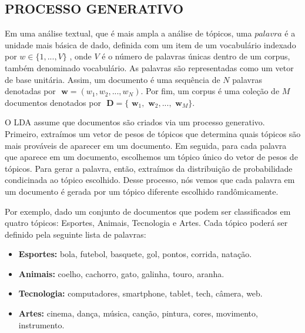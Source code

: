 \documentclass[12pt,a4paper]{article}
\begin{document}
  
  
  
  \subsection{PROCESSO GENERATIVO}
  
  Em uma análise textual, que é mais ampla a análise de  tópicos, uma $palavra$ é a unidade mais básica de dado, definida com um item de um vocabulário indexado por \(w \in \{1,. . . , V\}\)  , onde $V$ é o número de palavras únicas dentro de um corpus, também denominado vocabulário. As palavras são representadas como um vetor de base unitária. Assim, um documento é uma sequência de $N$ palavras denotadas por \(\textbf{ w} = (w_1, w_2,. . . ,  w_N)\). Por fim, um corpus é uma coleção de $M$ documentos denotados por \(\textbf{ D} = \{\textbf{ w}_1, \textbf{ w}_2, . . ., \textbf{ w}_M\}\).
  
   O LDA assume que documentos são criados via um processo generativo. Primeiro, extraímos um vetor de pesos de tópicos que determina
   quais tópicos são mais prováveis de aparecer em um documento. Em seguida, para cada palavra que aparece em um documento, escolhemos um tópico
   único do vetor de pesos de tópicos. Para gerar a palavra, então, extraímos da distribuição de probabilidade condicinada ao tópico escolhido.
   Desse processo, nós vemos que cada palavra em um documento é gerada por um tópico diferente escolhido randômicamente.

   Por exemplo, dado um conjunto de documentos que podem ser classificados em quatro tópicos: Esportes, Animais, Tecnologia e Artes. 
   Cada tópico poderá ser definido pela seguinte lista de palavras:
  
  \begin{itemize}
    \item \textbf{ Esportes:} bola, futebol, basquete, gol, pontos, corrida, natação.
    \item \textbf{ Animais:} coelho, cachorro, gato, galinha, touro, aranha.
    \item \textbf{ Tecnologia:} computadores, smartphone, tablet, tech, câmera, web.
    \item \textbf{ Artes:} cinema, dança, música, canção, pintura, cores, movimento, instrumento.
  \end{itemize}
  
\end{document}
